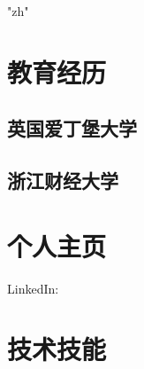 \documentclass[12pt,a4paper]{resume}
\begin{document}
\XeTeXlinebreaklocale "zh"

%
%

\vspace{5pt}
\subtitle{1991年, 男, 现居上海}
\vspace{5pt}
\subtitle{电话: 15867835270}
\vspace{5pt}
\subtitle{邮箱: junjieyemain@outlook.com}

\indent\makebox[\linewidth]{\rule{\paperwidth}{0.4pt}}



%
%
\begin{minipage}[t]{0.32\textwidth} 

\section{教育经历}

\subsection{英国爱丁堡大学}
\subtitle{理学硕士 \hfill 2014年9月 - 2015年11月}
\sectionsep

\subsection{浙江财经大学}
\subtitle{本科双学位 \hfill 2010年9月 - 2014年6月}
\sectionsep

\section{个人主页}
LinkedIn:  \href{https://www.linkedin.com/in/junjie-ye-49477b126/}{}

\sectionsep

\section{技术技能}


\end{minipage}
\end{document}
